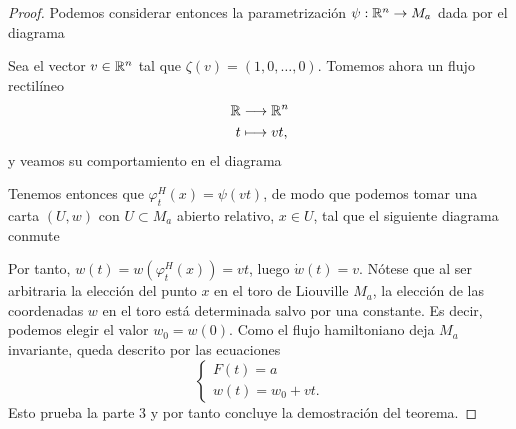 \begin{proof}
   Podemos considerar entonces la parametrización $\psi:\mathbb{R}^n\rightarrow M_a$ dada por el diagrama
  \begin{center}
   \end{center}
   Sea el vector $v\in \mathbb{R}^n$ tal que $\zeta(v)=(1,0,\dots,0)$. Tomemos ahora un flujo rectilíneo
   \begin{align*}
      \mathbb{R}&\longrightarrow \mathbb{R}^n\\ 
       t &\longmapsto  vt,
     \end{align*}
   y veamos su comportamiento en el diagrama 
   \begin{center}
    \end{center}
    Tenemos entonces que $\varphi_t^H(x)=\psi(vt)$, de modo que podemos tomar una carta $(U,w)$ con $U\subset M_a$ abierto relativo, $x\in U$, tal que el siguiente diagrama conmute
    \begin{center}
     \end{center}
     Por tanto, $w(t)=w(\varphi_t^H(x))=vt$, luego $\dot w(t)=v$. Nótese que al ser arbitraria la elección del punto $x$ en el toro de Liouville $M_a$, la elección de las coordenadas $w$ en el toro está determinada salvo por una constante. Es decir, podemos elegir el valor $w_{0}=w(0)$. Como el flujo hamiltoniano deja $M_a$ invariante, queda descrito por las ecuaciones
 \begin{equation*}
   \begin{cases}
     F(t)=a \\
     w(t)=w_{0}+vt.
   \end{cases}
 \end{equation*}
Esto prueba la parte $3$ y por tanto concluye la demostración del teorema.
 \end{proof}

